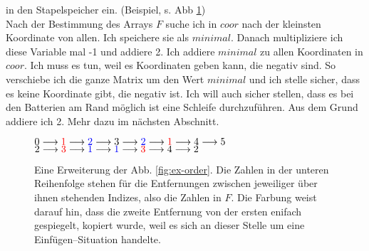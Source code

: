 \documentclass[a4paper,10pt,ngerman]{scrartcl}
\begin{document}
in den Stapelspeicher ein. (Beispiel, s. Abb \ref{fig:ex-dist})\\
Nach der Bestimmung des Arrays $F$ suche ich in $coor$ nach der kleinsten Koordinate von allen. 
Ich speichere sie als $minimal$. Danach multipliziere ich diese Variable mal -1 und addiere 2.
Ich addiere $minimal$ zu allen Koordinaten in $coor$. Ich muss es tun, weil es Koordinaten geben kann,
die negativ sind. So verschiebe ich die ganze Matrix um den Wert $minimal$ und ich stelle sicher,
dass es keine Koordinate gibt, die negativ ist. Ich will auch sicher stellen, dass es bei den Batterien am Rand
möglich ist eine Schleife durchzuführen. Aus dem Grund addiere ich 2. Mehr dazu im nächsten Abschnitt.

\begin{figure}[h]
\centering
$0 \longrightarrow {\color{red}1} \longrightarrow {\color{blue}2} \longrightarrow 3 \longrightarrow {\color{blue}2}
\longrightarrow {\color{red}1} \longrightarrow 4 \longrightarrow 5$\\
$2 \longrightarrow {\color{red}3} \longrightarrow {\color{blue}1} \longrightarrow {\color{blue}1} \longrightarrow
 {\color{red}3} \longrightarrow 4 \longrightarrow 2$
\caption{Eine Erweiterung der Abb. \ref{fig:ex-order}. Die Zahlen in der unteren Reihenfolge stehen für
die Entfernungen zwischen jeweiliger über ihnen stehenden Indizes, also die Zahlen in $F$. Die Farbung weist darauf hin, dass
die zweite Entfernung von der ersten enifach gespiegelt, kopiert wurde, weil es sich an dieser Stelle um
eine Einfügen--Situation handelte.}
\label{fig:ex-dist}
\end{figure}
\end{document}
